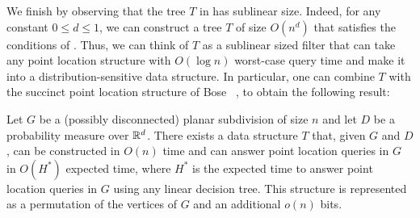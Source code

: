 \documentclass{patmorin}
\begin{document}
We finish by observing that the tree $T$ in 
has sublinear size. Indeed, for any constant $0 \le d \le 1$, we can
construct a tree $T$ of size $O(n^d)$ that satisfies the conditions
of .  Thus, we can think of $T$ as a sublinear
sized filter that can take any point location structure with $O(\log n)$
worst-case query time and make it into a distribution-sensitive data
structure.  In particular, one can combine $T$ with the succinct point
location structure of Bose \etal\ \cite[Theorem~2]{bchmm09}, to obtain the
following result:

\begin{thm}
  Let $G$ be a (possibly disconnected) planar subdivision of size $n$
  and let $D$ be a probability measure over $\mathbb{R}^d$.  There exists a data
  structure $T$ that, given $G$ and $D$, can be constructed in $O(n)$
  time and can answer point location queries in $G$ in $O(H^*)$ expected
  time, where $H^*$ is the expected time to answer point location queries
  in $G$ using any linear decision tree.  This structure is represented
  as a permutation of the vertices of $G$ and an additional $o(n)$ bits.
\end{thm}






\end{document}
